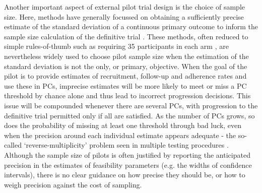 \documentclass{article}
\begin{document}

Another important aspect of external pilot trial design is the choice of sample size. Here, methods have generally focussed on obtaining a sufficiently precise estimate of the standard deviation of a continuous primary outcome to inform the sample size calculation of the definitive trial \cite{Teare2014, Browne1995, Julious2005, Sim2012, Eldridge2015, Whitehead2015}. These methods, often reduced to simple rules-of-thumb such as requiring 35 participants in each arm \cite{Teare2014}, are nevertheless widely used to choose pilot sample size when the estimation of the standard deviation is not the only, or primary, objective. When the goal of the pilot is to provide estimates of recruitment, follow-up and adherence rates and use these in PCs, imprecise estimates will be more likely to meet or miss a PC threshold by chance alone \cite{Eldridge2015, Cooper2018} and thus lead to incorrect progression decisions. This issue will be compounded whenever there are several PCs, with progression to the definitive trial permitted only if all are satisfied. As the number of PCs grows, so does the probability of missing at least one threshold through bad luck, even when the precision around each individual estimate appears adequate - the so-called `reverse-multiplicity' problem seen in multiple testing procedures \cite{Senn2007, Chuang-Stein2007}. Although the sample size of pilots is often justified by reporting the anticipated precision in the estimates of feasibility parameters (e.g. the widths of confidence intervals), there is no clear guidance on how precise they should be, or how to weigh precision against the cost of sampling.


\end{document}
